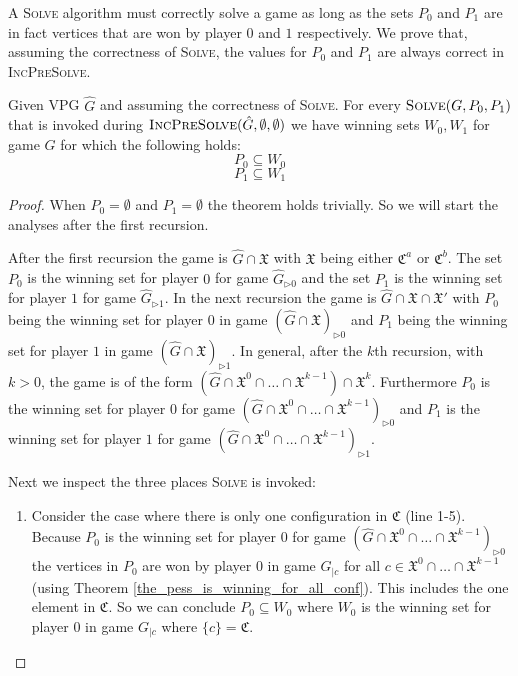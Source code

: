 A \textsc{Solve} algorithm must correctly solve a game as long as the sets $P_0$ and $P_1$ are in fact vertices that are won by player $0$ and $1$ respectively. We prove that, assuming the correctness of \textsc{Solve}, the values for $P_0$ and $P_1$ are always correct in \textsc{IncPreSolve}.
\begin{theorem}
	Given VPG $\hat{G}$ and assuming the correctness of \textsc{Solve}. For every $\textsc{Solve}(G,P_0,P_1)$ that is invoked during $\textsc{IncPreSolve}(\hat{G},\emptyset,\emptyset)$ we have winning sets $W_0,W_1$ for game $G$ for which the following holds:
	\[ P_0 \subseteq  W_0 \]
	\[ P_1 \subseteq  W_1 \]
	\begin{proof}
		When $P_0 = \emptyset$ and $P_1 = \emptyset$ the theorem holds trivially. So we will start the analyses after the first recursion. 
		
		After the first recursion the game is $\hat{G} \cap \mathfrak{X}$ with $\mathfrak{X}$ being either $\mathfrak{C}^a$ or $\mathfrak{C}^b$. The set $P_0$ is the winning set for player $0$ for game $\hat{G}_{\triangleright0}$ and the set $P_1$ is the winning set for player $1$ for game $\hat{G}_{\triangleright1}$. In the next recursion the game is $\hat{G} \cap \mathfrak{X} \cap \mathfrak{X}'$ with $P_0$ being the winning set for player $0$ in game $(\hat{G} \cap \mathfrak{X})_{\triangleright0}$ and $P_1$ being the winning set for player $1$ in game $(\hat{G} \cap \mathfrak{X})_{\triangleright1}$. In general, after the $k$th recursion, with $k > 0$, the game is of the form  $(\hat{G} \cap \mathfrak{X}^0 \cap \dots \cap \mathfrak{X}^{k-1}) \cap \mathfrak{X}^k$. Furthermore $P_0$ is the winning set for player $0$ for game $(\hat{G} \cap \mathfrak{X}^0 \cap \dots \cap \mathfrak{X}^{k-1})_{\triangleright0}$ and $P_1$ is the winning set for player $1$ for game $(\hat{G} \cap \mathfrak{X}^0 \cap \dots \cap \mathfrak{X}^{k-1})_{\triangleright1}$.
		
		Next we inspect the three places \textsc{Solve} is invoked:
		\begin{enumerate}
			\item Consider the case where there is only one configuration in $\mathfrak{C}$ (line 1-5). Because $P_0$ is the winning set for player $0$ for game $(\hat{G} \cap \mathfrak{X}^0 \cap \dots \cap \mathfrak{X}^{k-1})_{\triangleright0}$ the vertices in $P_0$ are won by player $0$ in game $G_{|c}$ for all $c \in \mathfrak{X}^0 \cap \dots \cap \mathfrak{X}^{k-1}$ (using Theorem \ref{the_pess_is_winning_for_all_conf}). This includes the one element in $\mathfrak{C}$. So we can conclude $P_0 \subseteq W_0$ where $W_0$ is the winning set for player $0$ in game $G_{|c}$ where $\{c\} = \mathfrak{C}$.
			

\end{enumerate}
\end{proof}
\end{theorem}
